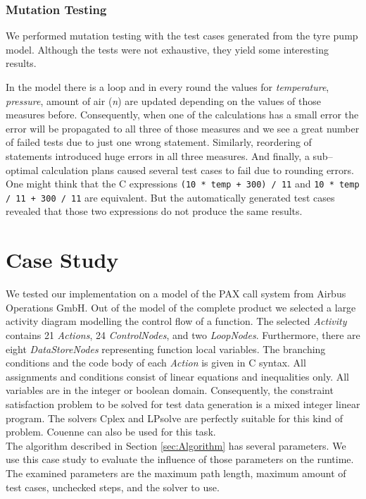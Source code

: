 \documentclass[runningheads,a4paper]{llncs}%
\newcommand{\UMLType}[1]{\textsf{\textit{#1}}} %
\newcommand{\OCLVar}[1]{\textit{#1}}
\begin{document}
\subsubsection{Mutation Testing}
We performed mutation testing with the test cases generated from the tyre pump model. %
Although the tests were not exhaustive, they yield some interesting results. %

In the model there is a loop and in every round the values for \OCLVar{temperature}, \OCLVar{pressure}, amount of air (\OCLVar{n}) are updated depending on the values of those measures before. Consequently, when one of the calculations has a small error the error will be propagated to all three of those measures and we see a great number of failed tests due to just one wrong statement. Similarly, reordering of statements introduced huge errors in all three measures. And finally, a sub--optimal calculation plans caused several test cases to fail due to rounding errors. One might think that the C expressions \verb$(10 * temp + 300) / 11$ and \verb$10 * temp / 11 + 300 / 11$ are equivalent. But the automatically generated test cases revealed that those two expressions do not produce the same results.
\section{Case Study}%
\label{sec:CaseStudy}%
We tested our implementation on a model of the PAX call system from Airbus Operations GmbH. Out of the model of the complete product we selected a large activity diagram modelling the control flow of a function. The selected \UMLType{Activity} contains 21 \UMLType{Actions}, 24 \UMLType{ControlNodes}, and two \UMLType{LoopNodes}. Furthermore, there are eight \UMLType{DataStoreNodes} representing function local variables. The branching conditions and the code body of each \UMLType{Action} is given in C syntax. All assignments and conditions consist of linear equations and inequalities only. All variables are in the integer or boolean domain. Consequently, the constraint satisfaction problem to be solved for test data generation is a mixed integer linear program. The solvers Cplex and LPsolve are perfectly suitable for this kind of problem. Couenne can also be used for this task.\\%
The algorithm described in Section \ref{sec:Algorithm} has several parameters. We use this case study to evaluate the influence of those parameters on the runtime. The examined parameters are the maximum path length, maximum amount of test cases, unchecked steps, and the solver to use.%
\end{document}
